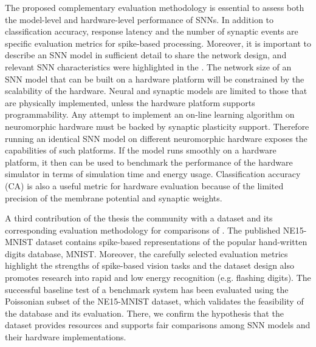 The proposed complementary evaluation methodology is essential to assess both the model-level and hardware-level performance of SNNs.
In addition to classification accuracy, response latency and the number of synaptic events are specific evaluation metrics for spike-based processing.
Moreover, it is important to describe an SNN model in sufficient detail to share the network design, and relevant SNN characteristics were highlighted in the \DIFdelbegin {}\DIFdelend \DIFaddbegin {}\DIFaddend .  
The network size of an SNN model that can be built on a hardware platform will be constrained by the scalability of the hardware.
Neural and synaptic models are limited to those that are physically implemented, unless the hardware platform supports programmability.
Any attempt to implement an on-line learning algorithm on neuromorphic hardware must be backed by synaptic plasticity support.
Therefore running an identical SNN model on different neuromorphic hardware exposes the capabilities of such platforms.
If the model runs smoothly on a hardware platform, it then can be used to benchmark the performance of the hardware simulator in terms of simulation time and energy usage.
Classification accuracy (CA) is also a useful metric for hardware evaluation because of the limited precision of the membrane potential and synaptic weights.


A third contribution of the thesis \DIFdelbegin {}\DIFdelend \DIFaddbegin {}\DIFaddend the community with a dataset and its corresponding evaluation methodology for comparisons of \DIFdelbegin {}\DIFdelend \DIFaddbegin {}\DIFaddend .
The published NE15-MNIST dataset contains \DIFdelbegin {}\DIFdelend spike-based representations of the popular hand-written digits database, MNIST.
Moreover, the carefully selected evaluation metrics highlight the strengths of spike-based vision tasks and the dataset design also promotes \DIFdelbegin {}\DIFdelend research into rapid and low energy recognition (e.g. flashing digits).
The successful baseline test of a benchmark system has been evaluated using the Poissonian subset of the NE15-MNIST dataset, which validates the feasibility of the database and its evaluation.
There, we confirm the hypothesis \DIFdelbegin {}\DIFdelend that the dataset provides resources and supports fair comparisons among SNN models and their hardware implementations.

